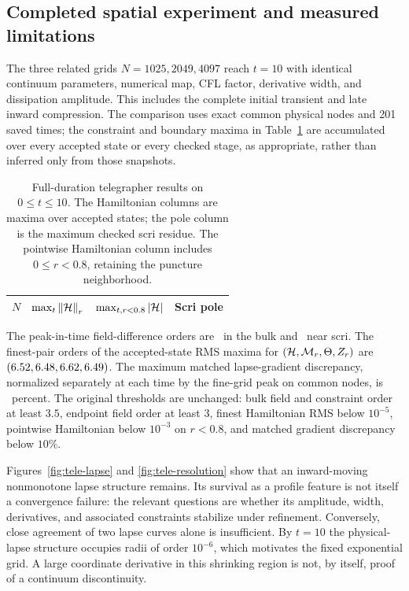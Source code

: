 \subsection{Completed spatial experiment and measured limitations}

The three related grids $N=1025,2049,4097$ reach $t=10$ with identical continuum parameters, numerical map, CFL factor, derivative width, and dissipation amplitude. This includes the complete initial transient and late inward compression. The comparison uses exact common physical nodes and 201 saved times; the constraint and boundary maxima in Table~\ref{tab:telegraph} are accumulated over every accepted state or every checked stage, as appropriate, rather than inferred only from those snapshots.

\begin{table}[tbp]
\caption{Full-duration telegrapher results on $0\leq t\leq10$. The Hamiltonian columns are maxima over accepted states; the pole column is the maximum checked scri residue. The pointwise Hamiltonian column includes $0\leq r<0.8$, retaining the puncture neighborhood.}
\label{tab:telegraph}
\begin{ruledtabular}
\small
\setlength{\tabcolsep}{3pt}
\begin{tabular}{rccc}
$N$ & $\max_t\left\|\mathcal H\right\|_r$ & $\max_{t,r<0.8}|\mathcal H|$ & Scri pole\\
\hline

\end{tabular}
\end{ruledtabular}
\end{table}

The peak-in-time field-difference orders are \TeleBulkOrder\ in the bulk and \TeleEndpointOrder\ near scri. The finest-pair orders of the accepted-state RMS maxima for $(\mathcal H,\mathcal M_r,\Theta,Z_r)$ are $(6.52,6.48,6.62,6.49)$. The maximum matched lapse-gradient discrepancy, normalized separately at each time by the fine-grid peak on common nodes, is \TeleGradientPercent\ percent. The original thresholds are unchanged: bulk field and constraint order at least $3.5$, endpoint field order at least $3$, finest Hamiltonian RMS below $10^{-5}$, pointwise Hamiltonian below $10^{-3}$ on $r<0.8$, and matched gradient discrepancy below $10\%$. \TeleSpatialAssessment

Figures~\ref{fig:tele-lapse} and \ref{fig:tele-resolution} show that an inward-moving nonmonotone lapse structure remains. Its survival as a profile feature is not itself a convergence failure: the relevant questions are whether its amplitude, width, derivatives, and associated constraints stabilize under refinement. Conversely, close agreement of two lapse curves alone is insufficient. By $t=10$ the physical-lapse structure occupies radii of order $10^{-6}$, which motivates the fixed exponential grid. A large coordinate derivative in this shrinking region is not, by itself, proof of a continuum discontinuity.

